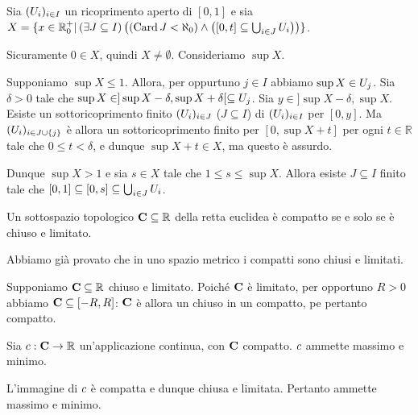 \Proof Sia $(U_i)_{i \in I}$ un ricoprimento aperto di $[0,1]$ e sia $X = \lbrace x \in \mathbb{R}^+_0 | \left ( \exists J \subseteq I \right ) \left ( \left ( \operatorname{Card}{J} < \aleph_0 \right ) \wedge \left ( [0,t] \subseteq \bigcup_{i \in J} U_i \right ) \right ) \rbrace$.
\par Sicuramente $0 \in X$, quindi $X \neq \emptyset$. Consideriamo $\sup X$.
\par Supponiamo $\sup X \leq 1$. Allora, per oppurtuno $j \in I$ abbiamo $\sup X \in U_j$. Sia $\delta > 0$ tale che $\sup X \in ]\sup X - \delta, \sup X + \delta[ \subseteq U_j$. Sia $y \in ]\sup X - \delta, \sup X$. Esiste un sottoricoprimento finito $(U_i)_{i \in J}$ ($J \subseteq I$) di $(U_i)_{i \in I}$ per $[0,y]$. Ma $(U_i)_{i \in J \cup \lbrace j \rbrace}$ \`e allora un sottoricoprimento finito per $[0,\sup X + t]$ per ogni $t \in \mathbb{R}$ tale che $0 \leq t < \delta$, e dunque $\sup X + t \in X$, ma questo \`e assurdo.
\par Dunque $\sup X > 1$ e sia $s \in X$ tale che $1 \leq s \leq \sup X$. Allora esiste $J \subseteq I$ finito tale che $[0,1] \subseteq [0,s] \subseteq \bigcup_{i \in J} U_i$. \EndProof
\begin{Corollary}
	Un sottospazio topologico $\mathbf{C} \subseteq \mathbb{R}$ della retta euclidea \`e compatto se e solo se \`e chiuso e limitato.
\end{Corollary}
\Proof Abbiamo gi\`a provato che in uno spazio metrico i compatti sono chiusi e limitati.
\par Supponiamo $\mathbf{C} \subseteq \mathbb{R}$ chiuso e limitato. Poich\'e $\mathbf{C}$ \`e limitato, per opportuno $R > 0$ abbiamo $\mathbf{C} \subseteq [-R,R]$: $\mathbf{C}$ \`e allora un chiuso in un compatto, pe pertanto compatto. \EndProof
\begin{Corollary}
	 Sia $c: \mathbf{C} \rightarrow \mathbb{R}$ un'applicazione continua, con $\mathbf{C}$ compatto. $c$ ammette massimo e minimo.
\end{Corollary}
\Proof L'immagine di $c$ \`e compatta e dunque chiusa e limitata. Pertanto ammette massimo e minimo. \EndProof
